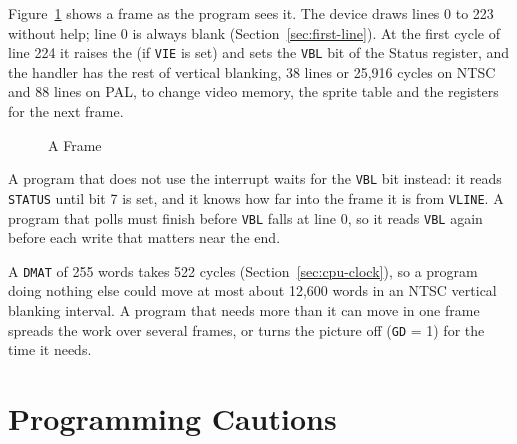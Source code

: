 Figure~\ref{fig:frame-flow} shows a frame as the program sees it. The device draws lines 0 to 223 without help; line 0
is always blank (Section~\ref{sec:first-line}). At the first cycle of line 224 it raises the  (if
\texttt{VIE} is set) and sets the \texttt{VBL} bit of the Status register, and the handler has the rest of vertical
blanking, 38 lines or 25,916 cycles on NTSC and 88 lines on PAL, to change video memory, the sprite table and the
registers for the next frame.

\begin{figure}[H]
	\centering
	\caption{A Frame}
	\label{fig:frame-flow}
\end{figure}

A program that does not use the interrupt waits for the \texttt{VBL} bit instead: it reads \texttt{STATUS} until bit 7
is set, and it knows how far into the frame it is from \texttt{VLINE}. A program that polls must finish before
\texttt{VBL} falls at line 0, so it reads \texttt{VBL} again before each write that matters near the end.

A \texttt{DMAT} of 255 words takes 522 cycles (Section~\ref{sec:cpu-clock}), so a program doing nothing else could move
at most about 12,600 words in an NTSC vertical blanking interval. A program that needs more than it can move in one
frame spreads the work over several frames, or turns the picture off (\texttt{GD} = 1) for the time it needs.

\section{Programming Cautions}
\label{sec:cautions}

